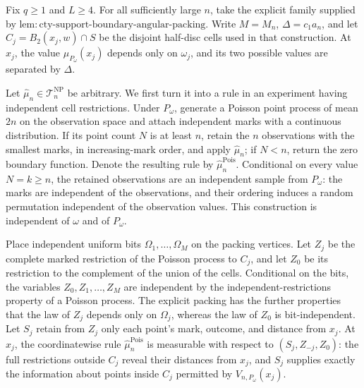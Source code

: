 Fix \(q\geq 1\) and \(L\geq 4\).  For all sufficiently large \(n\), take the explicit family supplied by \(\mathrm{lem:cty\text{-}support\text{-}boundary\text{-}angular\text{-}packing}\).  Write \(M=M_n\), \(\Delta=c_1a_n\), and let \(C_j=B_2(x_j,w)\cap S\) be the disjoint half-disc cells used in that construction.  At \(x_j\), the value \(\mu_{P_\omega}(x_j)\) depends only on \(\omega_j\), and its two possible values are separated by \(\Delta\).

Let \(\widehat\mu_n\in\mathcal T_n^{\mathrm{NP}}\) be arbitrary.  We first turn it into a rule in an experiment having independent cell restrictions.  Under \(P_\omega\), generate a Poisson point process of mean \(2n\) on the observation space and attach independent marks with a continuous distribution.  If its point count \(N\) is at least \(n\), retain the \(n\) observations with the smallest marks, in increasing-mark order, and apply \(\widehat\mu_n\); if \(N<n\), return the zero boundary function.  Denote the resulting rule by \(\widehat\mu_n^{\mathrm{Pois}}\).  Conditional on every value \(N=k\geq n\), the retained observations are an independent sample from \(P_\omega\): the marks are independent of the observations, and their ordering induces a random permutation independent of the observation values.  This construction is independent of \(\omega\) and of \(P_\omega\).

Place independent uniform bits \(\Omega_1,\ldots,\Omega_M\) on the packing vertices.  Let \(Z_j\) be the complete marked restriction of the Poisson process to \(C_j\), and let \(Z_0\) be its restriction to the complement of the union of the cells.  Conditional on the bits, the variables \(Z_0,Z_1,\ldots,Z_M\) are independent by the independent-restrictions property of a Poisson process.  The explicit packing has the further properties that the law of \(Z_j\) depends only on \(\Omega_j\), whereas the law of \(Z_0\) is bit-independent.  Let \(S_j\) retain from \(Z_j\) only each point's mark, outcome, and distance from \(x_j\).  At \(x_j\), the coordinatewise rule \(\widehat\mu_n^{\mathrm{Pois}}\) is measurable with respect to \((S_j,Z_{-j},Z_0)\): the full restrictions outside \(C_j\) reveal their distances from \(x_j\), and \(S_j\) supplies exactly the information about points inside \(C_j\) permitted by \(V_{n,P_\omega}(x_j)\).

